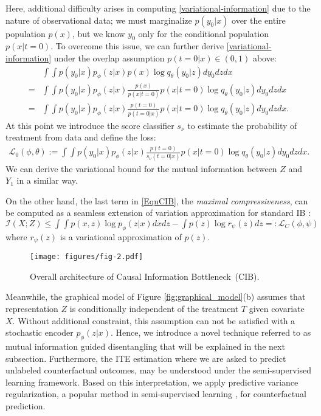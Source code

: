 \documentclass{article}
\begin{document}
    Here, additional difficulty arises in computing \eqref{variational-information} due to the nature of observational data; we must marginalize $p(y_0 | x)$ over the entire population $p(x)$, but we know $y_0$ only for the conditional population $ p (x| t = 0) $.
    To overcome this issue, we can further derive \eqref{variational-information} under the overlap assumption $p(t = 0 | x) \in (0,1)$ above:
    \begin{align*}
        &\displaystyle\int\int p(y_0|x) p_{\phi}(z|x) p(x) \log q_{\theta}(y_0|z)  dy_0dzdx\\
        =& \displaystyle\int\int p(y_0|x) p_{\phi}(z|x) \frac{p(x)}{p(x|t=0)}p(x|t=0)\log q_{\theta}(y_0|z)  dy_0dzdx\\
        =& \displaystyle\int\int p(y_0|x) p_{\phi}(z|x) \frac{p(t=0)}{p(t=0|x)}p(x|t=0)  \log q_{\theta}(y_0|z)  dy_0dzdx.
    \end{align*}
At this point we introduce the score classifier $ s_{\nu} $ to estimate the probability of treatment from data and define the loss:
    \begin{align*}
         \mathcal{L}_{0}(\phi, \theta) {:=} \displaystyle\int\int p(y_0|x) p_{\phi}(z|x) \frac{p(t=0)}{s_{\nu}(t=0|x)}p(x|t=0) \log q_{\theta}(y_0|z) dy_0dzdx.
    \end{align*}
    We can derive the variational bound for the mutual information between $Z$ and $Y_1$ in a similar way.



    On the other hand, the last term in \eqref{EqnCIB}, the \emph{maximal compressiveness}, can be computed as a seamless extension of variation approximation for standard IB \cite{Alemi17}: $\mathcal{I}(X;Z) \le \displaystyle\int\int p(x,z) \log p_{\phi}(z|x) dxdz - \int p(z) \log r_{\psi}(z) dz {=:} \mathcal{L}_{C}(\phi, \psi)$
where $r_{\psi}(z)$ is a variational approximation of $p(z)$. 



    \begin{figure}
        \centering
        \texttt{[image: figures/fig-2.pdf]}
        \caption{Overall architecture of Causal Information Bottleneck~(CIB). }\label{fig:network_architecure}
    \end{figure}
    
    Meanwhile, the graphical model of Figure \ref{fig:graphical_model}(b) assumes that representation $Z$ is conditionally independent of the treatment $T$ given covariate $X$. Without additional constraint, this assumption can not be satisfied with a stochastic encoder $p_{\phi}(z|x)$. Hence, we introduce a novel technique referred to as mutual information guided disentangling that will be explained in the next subsection.  Furthermore, the ITE estimation where we are asked to predict unlabeled counterfactual outcomes, may be understood under the  semi-supervised learning framework. Based on this interpretation, we apply predictive variance regularization, a popular method in semi-supervised learning \cite{jean2018semi}, for counterfactual prediction. 
\end{document}
